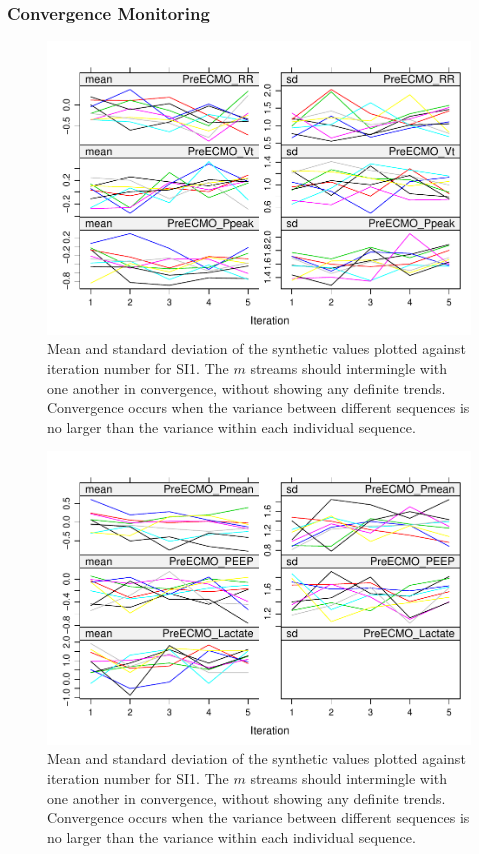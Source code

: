 \documentclass[12pt,]{article}
\begin{document}
\subsubsection{Convergence Monitoring}\label{convergence-monitoring}

\begin{figure}[H]

{\centering \includegraphics[width=0.75\linewidth]{figure/graphics-unnamed-chunk-16-1} 

}

\caption{\label{fig:converge-mean}Mean and standard deviation of the synthetic values plotted against iteration number for SI1.  The $m$ streams should intermingle with one another in convergence, without showing any definite trends.  Convergence occurs when the variance between different sequences is no larger than the variance within each individual sequence.}\label{fig:unnamed-chunk-161}
\end{figure}\begin{figure}[H]

{\centering \includegraphics[width=0.75\linewidth]{figure/graphics-unnamed-chunk-16-2} 

}

\caption{\label{fig:converge-mean}Mean and standard deviation of the synthetic values plotted against iteration number for SI1.  The $m$ streams should intermingle with one another in convergence, without showing any definite trends.  Convergence occurs when the variance between different sequences is no larger than the variance within each individual sequence.}\label{fig:unnamed-chunk-162}
\end{figure}\begin{figure}[H]


\end{figure}
\end{document}
